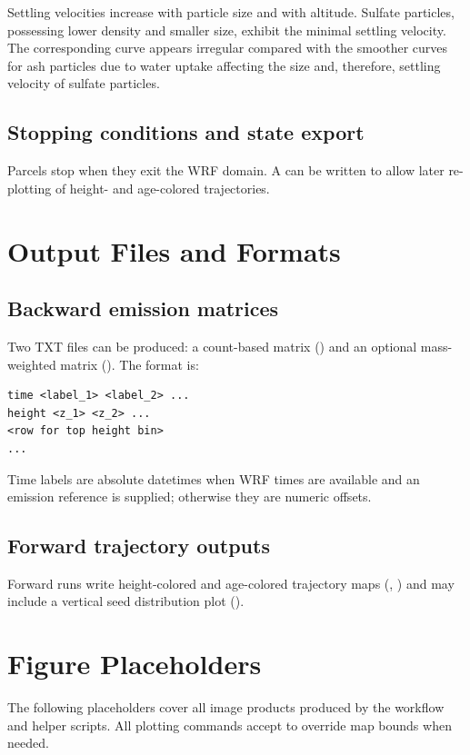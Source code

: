 \documentclass[11pt]{article}
\begin{document}
Settling velocities increase with particle size and with altitude. Sulfate
particles, possessing lower density and smaller size, exhibit the minimal
settling velocity. The corresponding curve appears irregular compared with the
smoother curves for ash particles due to water uptake affecting the size and,
therefore, settling velocity of sulfate particles.

\subsection{Stopping conditions and state export}
Parcels stop when they exit the WRF domain. A  can be
written to allow later re-plotting of height- and age-colored trajectories.

\section{Output Files and Formats}
\subsection{Backward emission matrices}
Two TXT files can be produced: a count-based matrix () and an
optional mass-weighted matrix (). The format is:
\begin{verbatim}
time <label_1> <label_2> ...
height <z_1> <z_2> ...
<row for top height bin>
...
\end{verbatim}
Time labels are absolute datetimes when WRF times are available and an emission
reference is supplied; otherwise they are numeric offsets.

\subsection{Forward trajectory outputs}
Forward runs write height-colored and age-colored trajectory maps
(, ) and may include a vertical seed
distribution plot ().

\section{Figure Placeholders}
The following placeholders cover all image products produced by the workflow
and helper scripts. All plotting commands accept  to override
map bounds when needed.
\end{document}
